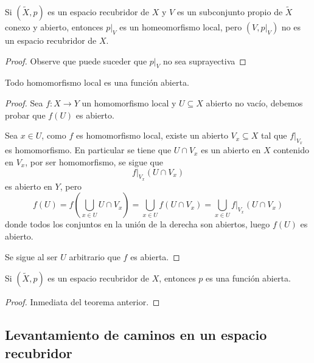 \documentclass[12pt]{report}
\theoremstyle{largebreak}
\newcommand\cf[3]{\ensuremath{#1:#2\rightarrow#3}}
\begin{document}
    \begin{exa}
        Si $(\widetilde{X},p)$ es un espacio recubridor de $X$ y $V$ es un subconjunto propio de $\widetilde{X}$ conexo y abierto, entonces $p\big|_{V}$ es un homeomorfismo local, pero $(V,p\big|_{V})$ no es un espacio recubridor de $X$.
    \end{exa}

    \begin{proof}
        Observe que puede suceder que $p\big|_{V}$ no sea suprayectiva
    \end{proof}

    \begin{propo}
        Todo homomorfismo local es una función abierta.
    \end{propo}

    \begin{proof}
        Sea $\cf{f}{X}{Y}$ un homomorfismo local y $U\subseteq X$ abierto no vacío, debemos probar que $f(U)$ es abierto.

        Sea $x\in U$, como $f$ es homomorfismo local, existe un abierto $V_x\subseteq X$ tal que $f\big|_{ V_x}$ es homomorfismo. En particular se tiene que $U\cap V_x$ es un abierto en $X$ contenido en $V_x$, por ser homomorfismo, se sigue que
        \begin{equation*}
            f|_{V_x}(U\cap V_x)
        \end{equation*}
        es abierto en $Y$, pero
        \begin{equation*}
            f(U)=f\left(\bigcup_{ x\in U} U\cap V_x\right)=\bigcup_{ x\in U} f(U\cap V_x)=\bigcup_{ x\in U} f\big|_{ V_x}(U\cap V_x)
        \end{equation*}
        donde todos los conjuntos en la unión de la derecha son abiertos, luego $f(U)$ es abierto.

        Se sigue al ser $U$ arbitrario que $f$ es abierta.
    \end{proof}

    \begin{cor}
        Si $(\widetilde{X},p)$ es un espacio recubridor de $X$, entonces $p$ es una función abierta.
    \end{cor}

    \begin{proof}
        Inmediata del teorema anterior.
    \end{proof}

    \subsection{Levantamiento de caminos en un espacio recubridor}
\end{document}
